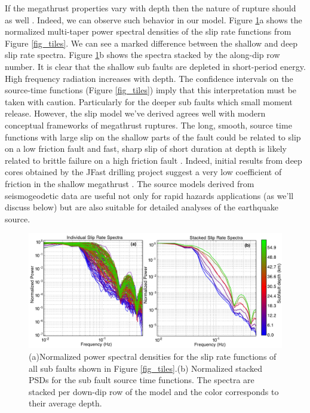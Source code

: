 If the megathrust properties vary with depth then the nature of rupture should as well \citep{lay2012}. Indeed, we can observe such behavior in our model. Figure \ref{fig_stfpsd}a shows the normalized multi-taper power spectral densities of the slip rate functions from Figure \ref{fig_tiles}. We can see a marked difference between the shallow and deep slip rate spectra. Figure \ref{fig_stfpsd}b shows the spectra stacked by the along-dip row number. It is clear that the shallow sub faults are depleted in short-period energy. High frequency radiation increases with depth. The confidence intervals on the source-time functions (Figure \ref{fig_tiles}) imply that this interpretation must be taken with caution. Particularly for the deeper sub faults which small moment release. However, the slip model we've derived agrees well with modern conceptual frameworks of megathrust ruptures. The long, smooth, source time functions with large slip on the shallow parts of the fault could be related to slip on a low friction fault and fast, sharp slip of short duration at depth is likely related to brittle failure on a high friction fault \citep{kanamori2004}. Indeed, initial results from deep cores obtained by the JFast drilling project suggest a very low coefficient of friction in the shallow megathrust \citep{fulton2013}. The source models derived from seismogeodetic data are useful not only for rapid hazards applications (as we'll discuss below) but are also suitable for detailed analyses of the earthquake source.

\begin{figure}[!ht] 
  \centering
  \includegraphics[width=0.99\linewidth]{./figures/ch4/stf_all.pdf}
    \caption[Source time function spectra]{(a)Normalized power spectral densities for the slip rate functions of all sub faults shown in Figure \ref{fig_tiles}.(b) Normalized stacked PSDs for the sub fault source time functions. The spectra are stacked per down-dip row of the model and the color corresponds to their average depth.}
  \label{fig_stfpsd}
\end{figure}



